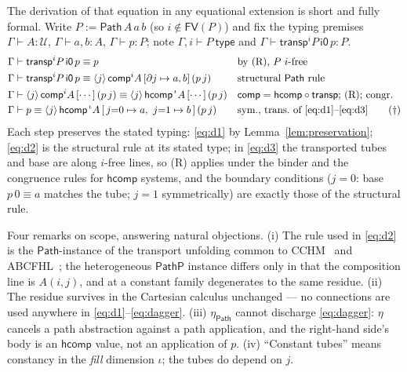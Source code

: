 \documentclass{lmcs}
\newcommand{\transp}{\mathsf{transp}}
\newcommand{\hcomp}{\mathsf{hcomp}}
\newcommand{\vcomp}{\mathsf{comp}}
\newcommand{\FV}{\mathsf{FV}}
\renewcommand{\conv}{\equiv}
\newcommand{\Path}{\mathsf{Path}}
\newcommand{\U}{\mathcal{U}}
\newcommand{\io}{\mathsf{i0}}
\begin{document}
\noindent The derivation of that equation in any equational extension
is short and fully formal.  Write $P := \Path\,A\,a\,b$ (so
$i \notin \FV(P)$) and fix the typing premises
$\Gamma \vdash A : \U$, $\Gamma \vdash a, b : A$,
$\Gamma \vdash p : P$; note $\Gamma, i \vdash P\ \mathsf{type}$ and
$\Gamma \vdash \transp^i P\,\io\,p : P$.
\begin{align}
  \Gamma &\vdash \transp^i P\,\io\,p \conv p
    && \text{by (R), $P$ $i$-free} \label{eq:d1}\\
  \Gamma &\vdash \transp^i P\,\io\,p \conv
    \langle j \rangle\, \vcomp^i A\,[\partial j \mapsto a, b]\,(p\,j)
    && \text{structural $\Path$ rule} \label{eq:d2}\\
  \Gamma &\vdash \langle j \rangle\, \vcomp^i A\,[\cdots]\,(p\,j)
    \conv \langle j \rangle\, \hcomp^{\,\iota} A\,[\cdots]\,(p\,j)
    && \text{$\vcomp = \hcomp \circ \transp$; (R); congr.}
    \label{eq:d3}\\
  \Gamma &\vdash p \conv
    \langle j \rangle\, \hcomp^{\,\iota} A\,
      [\,j{=}0 \mapsto a,\ j{=}1 \mapsto b\,]\,(p\,j)
    && \text{sym., trans.\ of \eqref{eq:d1}--\eqref{eq:d3}}
    \tag{$\dagger$}\label{eq:dagger}
\end{align}
Each step preserves the stated typing: \eqref{eq:d1} by
Lemma~\ref{lem:preservation}; \eqref{eq:d2} is the structural rule at
its stated type; in \eqref{eq:d3} the transported tubes and base are
along $i$-free lines, so (R) applies under the binder and the
congruence rules for $\hcomp$ systems, and the boundary conditions
($j{=}0$: base $p\,0 \conv a$ matches the tube; $j{=}1$
symmetrically) are exactly those of the structural rule.

Four remarks on scope, answering natural objections.  (i) The rule
used in \eqref{eq:d2} is the $\Path$-instance of the transport
unfolding common to CCHM~\cite[\S3]{CCHM} and
ABCFHL~\cite{ABCFHL}; the heterogeneous $\mathsf{PathP}$ instance
differs only in that the composition line is $A(i,j)$, and at a
constant family degenerates to the same residue.  (ii) The residue
survives in the Cartesian calculus unchanged --- no connections are
used anywhere in
\eqref{eq:d1}--\eqref{eq:dagger}.  (iii) $\eta_{\Path}$ cannot
discharge \eqref{eq:dagger}: $\eta$ cancels a path abstraction
against a path application, and the right-hand side's body is an
$\hcomp$ value, not an application of $p$.  (iv) ``Constant tubes''
means constancy in the \emph{fill} dimension $\iota$; the tubes do
depend on $j$.
\end{document}

